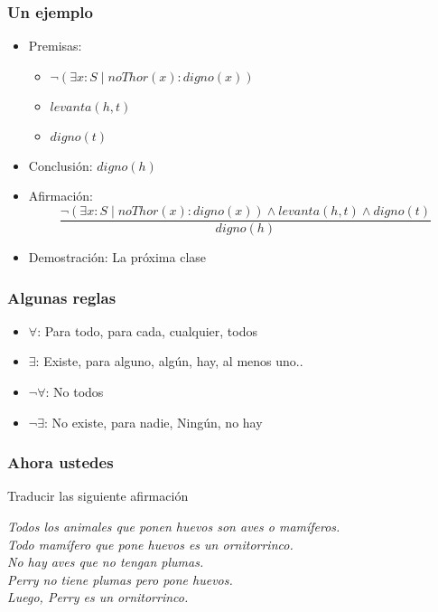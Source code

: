 \documentclass{beamer}
\begin{document}
\begin{frame}[fragile]
    \frametitle{Un ejemplo}
    \begin{itemize}
        \pause
        \item Premisas:
            \begin{itemize}
                \pause
                \item $\lnot (\exists x: S \mid noThor(x) : digno(x))$
                \pause
                \item $levanta(h, t)$
                \pause
                \item $digno(t)$
            \end{itemize}
        \pause
        \item Conclusión: $digno(h)$
        \pause
        \item Afirmación:
            $$\frac{\lnot (\exists x: S \mid noThor(x) : digno(x)) \land levanta(h, t) \land digno(t)}{digno(h)}$$
        \pause
        \item Demostración: La próxima clase
    \end{itemize}
\end{frame}

\begin{frame}[fragile]
    \frametitle{Algunas reglas}
    \begin{itemize}
        \pause
        \item $\forall$: Para todo, para cada, cualquier, todos
        \pause
        \item $\exists$: Existe, para alguno, algún, hay, al menos uno..
        \pause
        \item $\lnot \forall$: No todos
        \pause
        \item $\lnot \exists$: No existe, para nadie, Ningún, no hay
    \end{itemize}
\end{frame}

\begin{frame}[fragile]
    \frametitle{Ahora ustedes}
    \pause
    Traducir las siguiente afirmación
    \pause
    \begin{center}
        \textit{Todos los animales que ponen huevos son aves o mamíferos. \\
        Todo mamífero que pone huevos es un ornitorrinco. \\
        No hay aves que no tengan plumas. \\
        Perry no tiene plumas pero pone huevos. \\
        Luego, Perry es un ornitorrinco.}
    \end{center}
    \vspace*{165 pt}
\end{frame}
\end{document}
